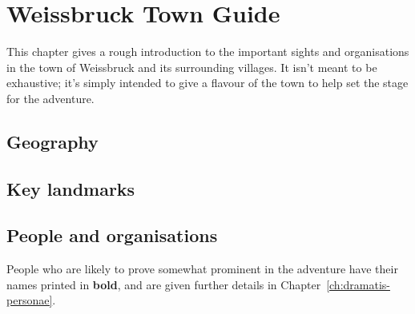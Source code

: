 \chapter{Weissbruck Town Guide}\label{ch:weissbruck}

This chapter gives a rough introduction to the important sights and
organisations in the town of Weissbruck and its surrounding villages. It isn't
meant to be exhaustive; it's simply intended to give a flavour of the town to
help set the stage for the adventure.

\section{Geography}

\section{Key landmarks}

\section{People and organisations}
People who are likely to prove somewhat prominent in the adventure have their
names printed in \textbf{bold}, and are given further details in
Chapter~\ref{ch:dramatis-personae}.

